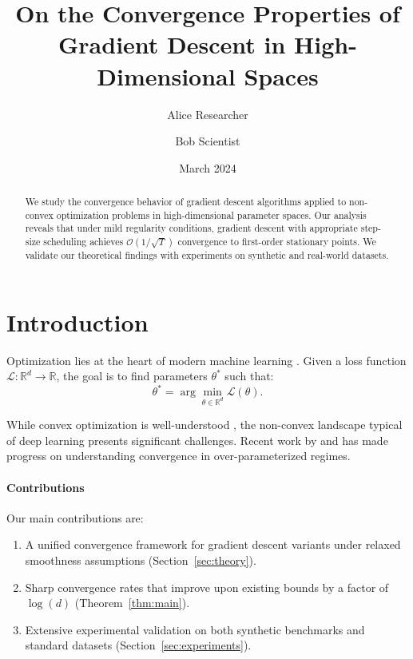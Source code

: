 \documentclass[11pt]{article}
\title{On the Convergence Properties of Gradient Descent in High-Dimensional Spaces}
\author{Alice Researcher \and Bob Scientist}
\date{March 2024}
\begin{document}
\maketitle

\begin{abstract}
We study the convergence behavior of gradient descent algorithms applied to
non-convex optimization problems in high-dimensional parameter spaces. Our
analysis reveals that under mild regularity conditions, gradient descent with
appropriate step-size scheduling achieves $\mathcal{O}(1/\sqrt{T})$
convergence to first-order stationary points. We validate our theoretical
findings with experiments on synthetic and real-world datasets.
\end{abstract}

\section{Introduction}\label{sec:intro}

Optimization lies at the heart of modern machine learning \cite{bottou2018}.
Given a loss function $\mathcal{L}: \mathbb{R}^d \to \mathbb{R}$, the goal
is to find parameters $\theta^*$ such that:
\begin{equation}\label{eq:objective}
\theta^* = \arg\min_{\theta \in \mathbb{R}^d} \mathcal{L}(\theta).
\end{equation}

While convex optimization is well-understood \cite{boyd2004,nesterov2004},
the non-convex landscape typical of deep learning presents significant
challenges. Recent work by \citet{allen2019} and \citet{du2019} has made
progress on understanding convergence in over-parameterized regimes.

\paragraph{Contributions} Our main contributions are:
\begin{enumerate}
\item A unified convergence framework for gradient descent variants under
  relaxed smoothness assumptions (Section~\ref{sec:theory}).
\item Sharp convergence rates that improve upon existing bounds by a factor
  of $\log(d)$ (Theorem~\ref{thm:main}).
\item Extensive experimental validation on both synthetic benchmarks and
  standard datasets (Section~\ref{sec:experiments}).
\end{enumerate}
\end{document}
